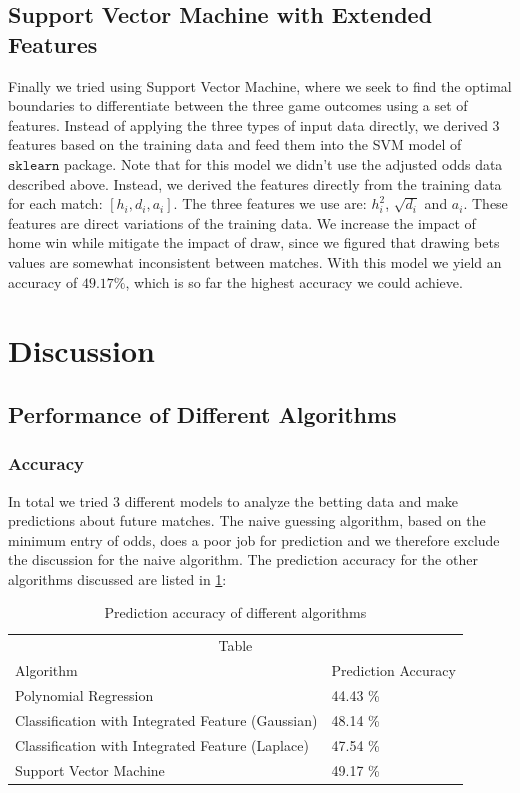 \documentclass{article}
\begin{document}
\subsection{Support Vector Machine with Extended Features}

Finally we tried using Support Vector Machine, where we seek to find the optimal boundaries to differentiate between the three game outcomes using a set of features. Instead of applying the three types of input data directly, we derived 3 features based on the training data and feed them into the SVM model of $\texttt{sklearn}$ package. Note that for this model we didn't use the adjusted odds data described above. Instead, we derived the features directly from the training data for each match: $[h_i, d_i, a_i]$. The three features we use are: $h_i^2$, $\sqrt{d_i}$ and $a_i$. These features are direct variations of the training data. We increase the impact of home win while mitigate the impact of draw, since we figured that drawing bets values are somewhat inconsistent between matches. With this model we yield an accuracy of $49.17 \%$, which is so far the highest accuracy we could achieve.


\section{Discussion}
\subsection{Performance of Different Algorithms}

\subsubsection{Accuracy}
In total we tried 3 different models to analyze the betting data and make predictions about future matches. The naive guessing algorithm, based on the minimum entry of odds, does a poor job for prediction and we therefore exclude the discussion for the naive algorithm. The prediction accuracy for the other algorithms discussed are listed in \ref{sample-table}:

	\begin{table}[t]
		\caption{Prediction accuracy of different algorithms}
		\label{sample-table}
		\centering
		\begin{tabular}{ll}
			\toprule
			\multicolumn{2}{c}{Table}                   \\
			\cmidrule{1-2}
			Algorithm     & Prediction Accuracy    \\
			\midrule
		Polynomial Regression & 44.43 \% \\ 
		Classification with Integrated Feature (Gaussian) & 48.14 \% \\
		Classification with Integrated Feature (Laplace) & 47.54 \% \\
		Support Vector Machine & 49.17 \% \\
			\bottomrule
		\end{tabular}
	\end{table}
\end{document}
